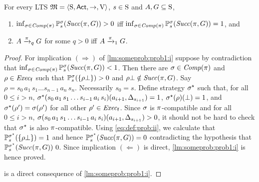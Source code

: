 \begin{lemma}\label{lm:someprob:prob1}
  For every LTS $\model = \tup{\S,\Act,\ra,\V}$, $s\in\S$ and
  $A,G\subseteq\S$,
  \begin{enumerate}
  \item\label{lm:someprob:prob1:i}%
    $\inf_{\strat\in\Comp(\plan)}\Prob^\strat_s(\Succ(\plan,G))>0$ iff\newline
    $\inf_{\strat\in\Comp(\plan)}\Prob^\strat_s(\Succ(\plan,G))=1$, and
  \item\label{lm:someprob:prob1:ii}%
    $A\reach{\plan}_q G$ for some $q>0$ iff $A\reach{\plan}_1 G$.
  \end{enumerate}
\end{lemma}
%
%
%
\begin{proof}
  For implication $(\Rightarrow)$ of \cref{lm:someprob:prob1:i}
  suppose by contradiction that
  $\inf_{\strat\in\Comp(\plan)}\Prob^\strat_s(\Succ(\plan,G))<1$.
  Then there are $\strat\in\Comp(\plan)$ and $\rho\in\execf$ such that
  $\Prob^\strat_s(\{\rho\complete\})>0$ and
  $\rho\complete\notin\Succ(\plan,G)$.
  Say $\rho=s_0\, a_1\, s_1\ldots s_{n-1}\, a_n\, s_n$.  Necessarily
  $s_0=s$.
  Define strategy $\strat^\star$ such that, for all $0\leq i>n$,
  $\strat^\star(s_0\, a_1\, s_1\ldots s_{i-1}\, a_i\, s_i)(a_{i+1},\Dirac_{s_{i+1}})=1$,
  $\strat^\star(\rho)(\complete)=1$, and
  $\strat^\star(\rho')=\strat(\rho')$ for all other $\rho'\in\execf$.
  Since $\strat$ is $\plan$-compatible and  for all $0\leq i>n$,
  $\strat(s_0\, a_1\, s_1\ldots s_{i-1}\, a_i\, s_i)(a_{i+1},\Dirac_{s_{i+1}})>0$,
  it should not be hard to check that $\strat^\star$ is also
  $\plan$-compatible.
  Using \cref{eq:def:prob:ii}, we calculate that
  $\Prob^{\strat^\star}_s(\{\rho\complete\})=1$ and hence
  $\Prob^{\strat^\star}_s(\Succ(\plan,G))=0$ contradicting the
  hypothesis that $\Prob^{\strat^\star}_s(\Succ(\plan,G))~0$.
  Since implication $(\Leftarrow)$ is direct,
  \cref{lm:someprob:prob1:i} is hence proved.

   is a direct consequence of
  \cref{lm:someprob:prob1:i}.
\end{proof}

